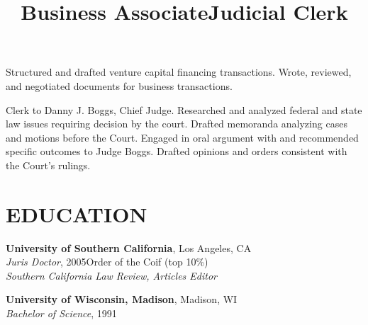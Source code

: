 \documentclass[margin]{res}
\begin{document}
\begin{resume}
\title{\textbf{Business Associate}}
\begin{position}
\hspace*{.5cm}Structured and drafted venture capital financing transactions. Wrote, reviewed, and negotiated documents for business transactions.
\end{position}

\title{\textbf{Judicial Clerk}}
\begin{position}
\hspace*{.5cm}Clerk to Danny J. Boggs, Chief Judge. Researched and analyzed federal and state law issues requiring decision by the court. Drafted memoranda analyzing cases and motions before the Court. Engaged in oral argument with and recommended specific outcomes to Judge Boggs. Drafted opinions and orders consistent with the Court’s rulings.
\end{position}

\section{EDUCATION}

\textbf{University of Southern California}, Los Angeles, CA\\
{\sl Juris Doctor}, 2005\hfill Order of the Coif
(top 10\%)
\\
{\sl Southern California Law Review, Articles Editor}

\textbf{University of Wisconsin, Madison}, Madison, WI\\
{\sl Bachelor of Science}, 1991

\end{resume}
\end{document}
